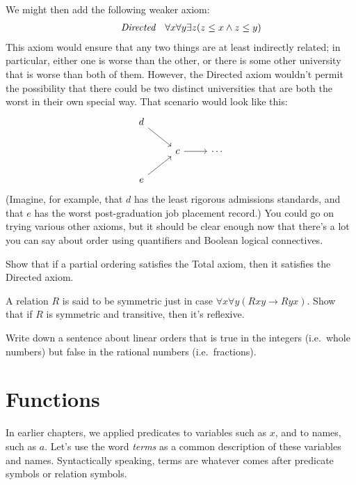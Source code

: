 We might then add the following weaker axiom:
\[ \begin{array}{>{\raggedleft\it}p{2cm} l}
Directed & \forall x\forall y\exists z(z\leq x\wedge z\leq
           y) \end{array} \]
This axiom would ensure that any two things are at least indirectly
related; in particular, either one is worse than the other, or there
is some other university that is worse than both of them.  However,
the Directed axiom wouldn't permit the possibility that there could be
two distinct universities that are both the worst in their own special
way.  That scenario would look like this:
\[ \begin{tikzcd}
    d \arrow{dr} & \\
    & c \arrow{r} & \cdots \\
    e \arrow{ur} & \end{tikzcd} \] (Imagine, for example, that $d$ has
the least rigorous admissions standards, and that $e$ has the worst
post-graduation job placement record.)  You could go on trying various
other axioms, but it should be clear enough now that there's a lot you
can say about order using quantifiers and Boolean logical connectives.

\begin{exercise} Show that if a partial ordering satisfies the Total axiom, then
  it satisfies the Directed axiom.
\end{exercise}

\begin{exercise} A relation $R$ is said to be symmetric just in case
  \mbox{$\forall x\forall y(Rxy\to Ryx)$}.  Show that if $R$ is
  symmetric and transitive, then it's reflexive.
\end{exercise}

\begin{exercise} Write down a sentence about linear orders that is
  true in the integers (i.e.\ whole numbers) but false in the rational
  numbers (i.e.\ fractions). \end{exercise}




\section{Functions}

In earlier chapters, we applied predicates to variables such as $x$,
and to names, such as $a$.  Let's use the word \emph{terms} as a
common description of these variables and names.  Syntactically
speaking, terms are whatever comes after predicate symbols or relation
symbols.


